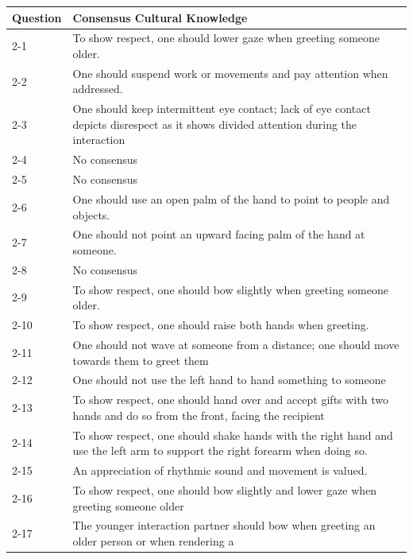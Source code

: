 \documentclass{CSSRforAfrica}
\begin{document}
\begin{table}[H]
\begin{center}
\begin{tabularx}{\linewidth}{|l |X|}
\hline \hline
 {\small {\bf Question}} & {\small {\bf Consensus Cultural Knowledge}}\\
\hline
{\small 2-1 }  & {\small To show respect, one should lower gaze when greeting someone older.}\\
{\small 2-2 }  & {\small One should suspend work or movements and pay attention when addressed.}\\
{\small 2-3 }  & {\small One should keep intermittent eye contact; lack of eye contact depicts disrespect as it shows divided
attention during the interaction}\\
{\small 2-4 }  & {\small No consensus}\\
{\small 2-5 }  & {\small No consensus}\\
{\small 2-6 }   & {\small One should use an open palm of the hand to point to people and objects.}\\
{\small 2-7 }  & {\small One should not point an upward facing palm of the hand at someone.}\\
{\small 2-8 }  & {\small No consensus}\\
{\small 2-9 }  & {\small To show respect, one should bow slightly when greeting someone older.}\\
{\small 2-10 }  & {\small To show respect, one should raise both hands when greeting.}\\
{\small 2-11 } &  {\small One should not wave at someone from a distance; one should move towards them to greet them}\\
{\small 2-12 }  & {\small One should not use the left hand to hand something to someone}\\
{\small 2-13 } & {\small To show respect, one should hand over and accept gifts with two hands and do so from the front,
facing the recipient}\\
{\small 2-14 }  & {\small To show respect, one should shake hands with the right hand and use the left arm to support the
right forearm when doing so.}\\
{\small 2-15 }  & {\small An appreciation of rhythmic sound and movement is valued.}\\
{\small 2-16 }  & {\small To show respect, one should bow slightly and lower gaze when greeting someone older}\\
{\small 2-17 } & {\small The younger interaction partner should bow when greeting an older person or when rendering a
}
\end{tabularx}
\end{center}
\end{table}
\end{document}
